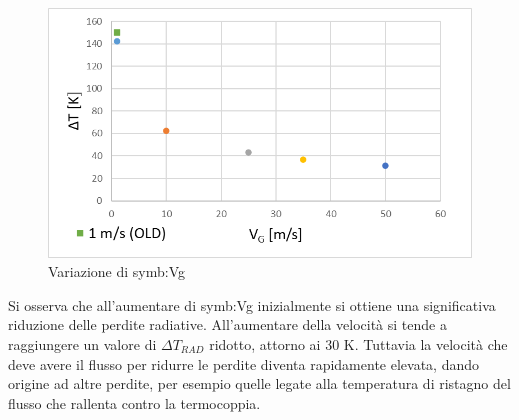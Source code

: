 \begin{figure}[H]
	\centering
	\includegraphics[width=0.7\linewidth]{"../sperimentazione nei propulsori/varV"}
	\caption{Variazione di \gls{symb:Vg}}
	\label{fig:varv}
\end{figure}

Si osserva che all'aumentare di \gls{symb:Vg} inizialmente si ottiene una significativa riduzione delle perdite radiative. All'aumentare della velocità si tende a raggiungere un valore di $\Delta T_{\textit{RAD}}$ ridotto, attorno ai 30 K. Tuttavia la velocità che deve avere il flusso per ridurre le perdite diventa rapidamente elevata, dando origine ad altre perdite, per esempio quelle legate alla temperatura di ristagno del flusso che rallenta contro la termocoppia. 